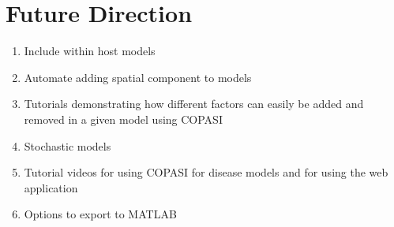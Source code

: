 \documentclass{article}
\begin{document}
\section{Future Direction}
\begin{enumerate}
    \item Include within host models
    \item Automate adding spatial component to models
    \item Tutorials demonstrating how different factors can easily be added and removed in a given model using COPASI
    \item Stochastic models
    \item Tutorial videos for using COPASI for disease models and for using the web application
    \item Options to export to MATLAB
    
\end{enumerate}
\end{document}

